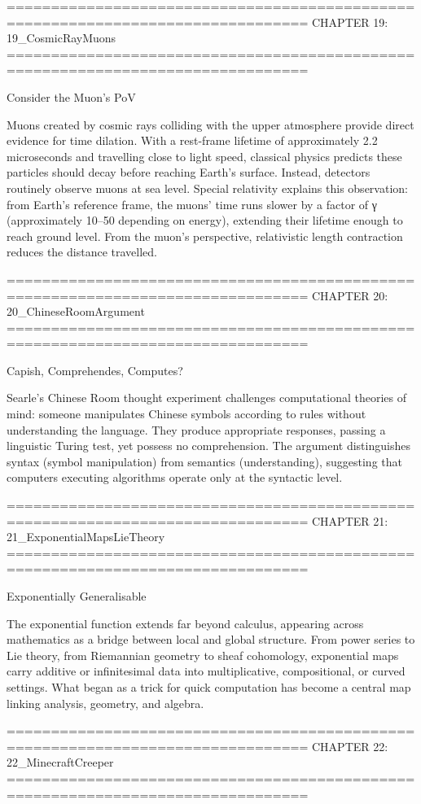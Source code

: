 ================================================================================
CHAPTER 19: 19_CosmicRayMuons
================================================================================

Consider the Muon's PoV

Muons created by cosmic rays colliding with the upper atmosphere provide direct evidence for time dilation. With a rest-frame lifetime of approximately 2.2 microseconds and travelling close to light speed, classical physics predicts these particles should decay before reaching Earth's surface. Instead, detectors routinely observe muons at sea level. Special relativity explains this observation: from Earth's reference frame, the muons' time runs slower by a factor of γ (approximately 10–50 depending on energy), extending their lifetime enough to reach ground level. From the muon's perspective, relativistic length contraction reduces the distance travelled.


================================================================================
CHAPTER 20: 20_ChineseRoomArgument
================================================================================

Capish, Comprehendes, Computes?

Searle's Chinese Room thought experiment challenges computational theories of mind: someone manipulates Chinese symbols according to rules without understanding the language. They produce appropriate responses, passing a linguistic Turing test, yet possess no comprehension. The argument distinguishes syntax (symbol manipulation) from semantics (understanding), suggesting that computers executing algorithms operate only at the syntactic level.


================================================================================
CHAPTER 21: 21_ExponentialMapsLieTheory
================================================================================

Exponentially Generalisable

The exponential function extends far beyond calculus, appearing across mathematics as a bridge between local and global structure. From power series to Lie theory, from Riemannian geometry to sheaf cohomology, exponential maps carry additive or infinitesimal data into multiplicative, compositional, or curved settings. What began as a trick for quick computation has become a central map linking analysis, geometry, and algebra.


================================================================================
CHAPTER 22: 22_MinecraftCreeper
================================================================================

